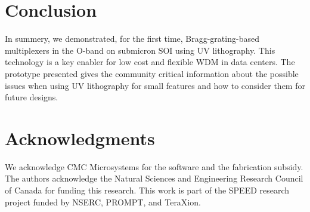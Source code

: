 \documentclass[letterpaper,10pt]{article}
\begin{document}
	
	\section{Conclusion}
	In summery, we demonstrated, for the first time, Bragg-grating-based multiplexers in the O-band on submicron SOI using UV lithography. This technology is a key enabler for low cost and flexible WDM in data centers. 
	The prototype presented gives the community critical information about the possible issues when using UV lithography for small features and how to consider them for future designs.
	
	\section*{Acknowledgments}
	We acknowledge CMC Microsystems for the  software and the fabrication subsidy. The authors acknowledge the Natural Sciences and Engineering Research Council of Canada for funding this research. This work is part of the SPEED research project funded by NSERC, PROMPT, and TeraXion.
	
	
	
	
\end{document}
